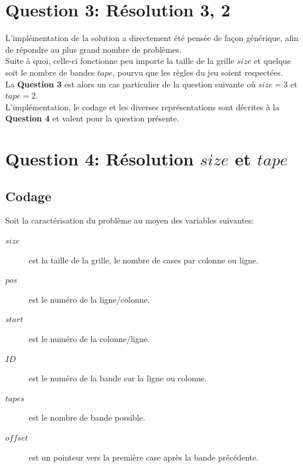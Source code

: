 \documentclass[a4paper,12pt]{report}
\begin{document}
\chapter{Question 3: Résolution 3, 2}

L'implémentation de la solution a directement été pensée de façon générique, afin de répondre au plus grand nombre de problèmes.\\
Suite à quoi, celle-ci fonctionne peu importe la taille de la grille $size$ et quelque soit le nombre de bandes $tape$, pourvu que les règles du jeu soient respectées. \\

La \textbf{Question 3} est alors un cas particulier de la question suivante où $size=3$ et $tape=2$.\\

L'implémentation, le codage et les diverses représentations sont décrites à la \textbf{Question 4} et valent pour la question présente.

\chapter{Question 4: Résolution $size$ et $tape$}

\section{Codage}
%

Soit la caractérisation du problème au moyen des variables suivantes:
\begin{description}
\item[$size$] est la taille de la grille, le nombre de cases par colonne ou ligne.
\item[$pos$] est le numéro de la ligne/colonne.
\item[$start$] est le numéro de la colonne/ligne.
\item[$ID$] est le numéro de la bande sur la ligne ou colonne.
\item[$tapes$] est le nombre de bande possible.
\item[$offset$] est un pointeur vers la première case après la bande précédente.\\
\end{description}						
\end{document}
